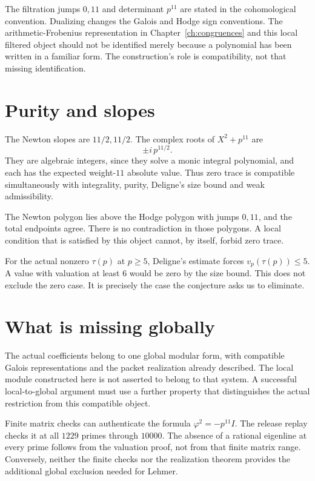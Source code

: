 The filtration jumps $0,11$ and determinant $p^{11}$ are stated in the cohomological convention. Dualizing changes the Galois and Hodge sign conventions. The arithmetic-Frobenius representation in Chapter~\ref{ch:congruences} and this local filtered object should not be identified merely because a polynomial has been written in a familiar form. The construction's role is compatibility, not that missing identification.

\section{Purity and slopes}
The Newton slopes are $11/2,11/2$. The complex roots of $X^2+p^{11}$ are
\[
\pm i\,p^{11/2}.
\]
They are algebraic integers, since they solve a monic integral polynomial, and each has the expected weight-$11$ absolute value. Thus zero trace is compatible simultaneously with integrality, purity, Deligne's size bound and weak admissibility.

The Newton polygon lies above the Hodge polygon with jumps $0,11$, and the total endpoints agree. There is no contradiction in those polygons. A local condition that is satisfied by this object cannot, by itself, forbid zero trace.

For the actual nonzero $\tau(p)$ at $p\ge5$, Deligne's estimate forces $v_p(\tau(p))\le5$. A value with valuation at least $6$ would be zero by the size bound. This does not exclude the zero case. It is precisely the case the conjecture asks us to eliminate.


\section{What is missing globally}
The actual coefficients belong to one global modular form, with compatible Galois representations and the packet realization already described. The local module constructed here is not asserted to belong to that system. A successful local-to-global argument must use a further property that distinguishes the actual restriction from this compatible object.

Finite matrix checks can authenticate the formula $\varphi^2=-p^{11}I$. The release replay checks it at all $1229$ primes through $10000$. The absence of a rational eigenline at every prime follows from the valuation proof, not from that finite matrix range. Conversely, neither the finite checks nor the realization theorem provides the additional global exclusion needed for Lehmer.

